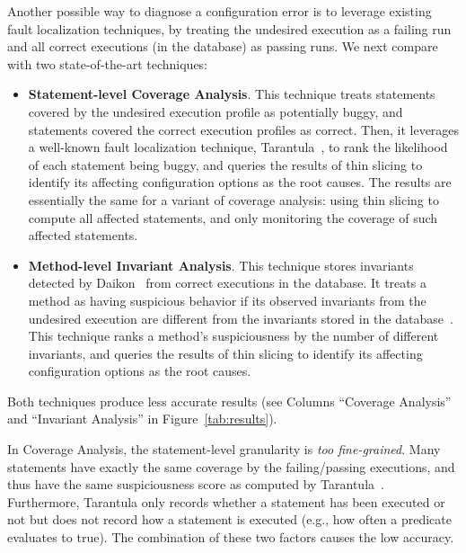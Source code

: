

Another possible way to diagnose a configuration error is to leverage
existing fault localization techniques, by treating the undesired
execution as a failing run and all correct executions (in the database)
as passing runs. We next compare \ourtool with two state-of-the-art
techniques: %

\begin{itemize}
\item \textbf{Statement-level Coverage Analysis}. This technique treats statements covered
by the undesired execution profile as potentially buggy, and statements
covered the correct execution profiles as correct.
Then, it leverages a well-known fault localization technique,
Tarantula~\cite{Jones:2002}, to rank the likelihood of each
statement being buggy, and queries the results of thin slicing
to identify its affecting configuration options as the root causes.
The results are essentially the same for a variant of
coverage analysis: using thin slicing to compute all affected statements,
and only monitoring the coverage of such affected statements.

\item \textbf{Method-level Invariant Analysis}. This technique stores invariants detected
by Daikon~\cite{Ernst:1999} from correct executions in the database.
It treats a method as having suspicious behavior if its observed invariants
from the undesired execution are different from the invariants stored
in the database~\cite{McCamant:2003}. This technique ranks a method's suspiciousness by
the number of different invariants, and queries the results of thin slicing
to identify its affecting configuration options as the root causes. 
\end{itemize}


Both techniques produce less accurate results (see Columns
``Coverage Analysis'' and ``Invariant Analysis'' in Figure~\ref{tab:results}).

In Coverage Analysis, the statement-level granularity is \textit{too fine-grained}.
Many statements have exactly the same coverage by the failing/passing executions,
and thus have the same suspiciousness score as computed by Tarantula~\cite{Jones:2002}.
Furthermore, Tarantula only records whether a
statement has been executed or not but does not record how a statement is 
executed (e.g., how often a predicate evaluates to true). The combination
of these two factors causes the low accuracy.


